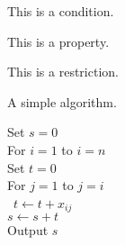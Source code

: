 \documentclass[supplementary,lineno]{biometrika}
\begin{document}
\begin{condition}
This is a condition.
\end{condition}


\begin{property}
This is a property.
\end{property}

\begin{restriction}
This is a restriction.
\end{restriction}

\begin{algo}
A simple algorithm.
\begin{tabbing}
   \qquad \enspace Set $s=0$\\
   \qquad \enspace For $i=1$ to $i=n$ \\
   \qquad \qquad Set $t=0$\\
   \qquad \qquad For $j=1$ to $j=i$ \\\
  \qquad \qquad\qquad  $t \leftarrow t + x_{ij}$ \\
\qquad \qquad $s \leftarrow s + t$ \\
\qquad \enspace Output $s$
\end{tabbing}
\end{algo}


\end{document}

